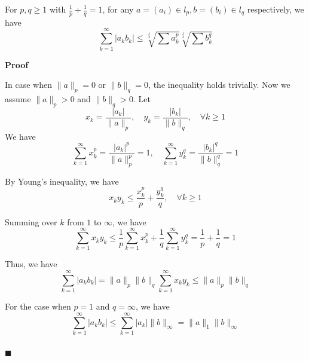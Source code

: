 \documentclass[main.tex]{subfiles}
\begin{document}
\begin{theorem}
    For $p, q \ge 1$ with $\frac{1}{p} + \frac{1}{q} = 1$, for any $a = (a_i)\in l_p, b = (b_i) \in l_q$ respectively, we have \[ \sum_{k=1}^{\infty} |a_k b_k| \le \sqrt[\frac{1}{p}]{\sum a_k^p} \sqrt[\frac{1}{q}]{\sum b_k^q}  \]
\end{theorem}
\par \noindent \textbf{Proof} 
\par In case when $\|a\|_p = 0$ or $\|b\|_q = 0$, the inequality holds trivially. Now we assume $\|a\|_p > 0$ and $\|b\|_q > 0$. Let 
\begin{equation}
    x_k = \frac{|a_k|}{\|a\|_p}, \quad y_k = \frac{|b_k|}{\|b\|_q}, \quad \forall k \ge 1
\end{equation}
We have 
\begin{equation}
    \sum_{k=1}^{\infty} x_k^p = \frac{|a_k|^p}{\|a\|_p^p} = 1, \quad \sum_{k=1}^{\infty} y_k^q = \frac{|b_k|^q}{\|b\|_q^q} = 1
\end{equation}
\par By Young's inequality, we have
\begin{equation}
    x_k y_k \le \dfrac{x_k^p}{p} + \dfrac{y_k^q}{q}, \quad \forall k \ge 1
\end{equation}
\par Summing over $k$ from $1$ to $\infty$, we have
\begin{equation}
    \sum_{k=1}^{\infty} x_k y_k \le \dfrac{1}{p} \sum_{k=1}^{\infty} x_k^p + \dfrac{1}{q} \sum_{k=1}^{\infty} y_k^q = \dfrac{1}{p} + \dfrac{1}{q} = 1
\end{equation}
\par Thus, we have
\begin{equation}
    \sum_{k=1}^{\infty} |a_k b_k| = \|a\|_p \|b\|_q \sum_{k=1}^{\infty} x_k y_k \le \|a\|_p \|b\|_q
\end{equation}
\par For the case when $p = 1$ and $q = \infty$, we have
\begin{equation}
    \sum_{k=1}^{\infty} |a_k b_k| \le \sum_{k=1}^{\infty} |a_k| \|b\|_{\infty} = \|a\|_1 \|b\|_{\infty}
\end{equation}
\\ \null \hfill $\blacksquare$
\end{document}
